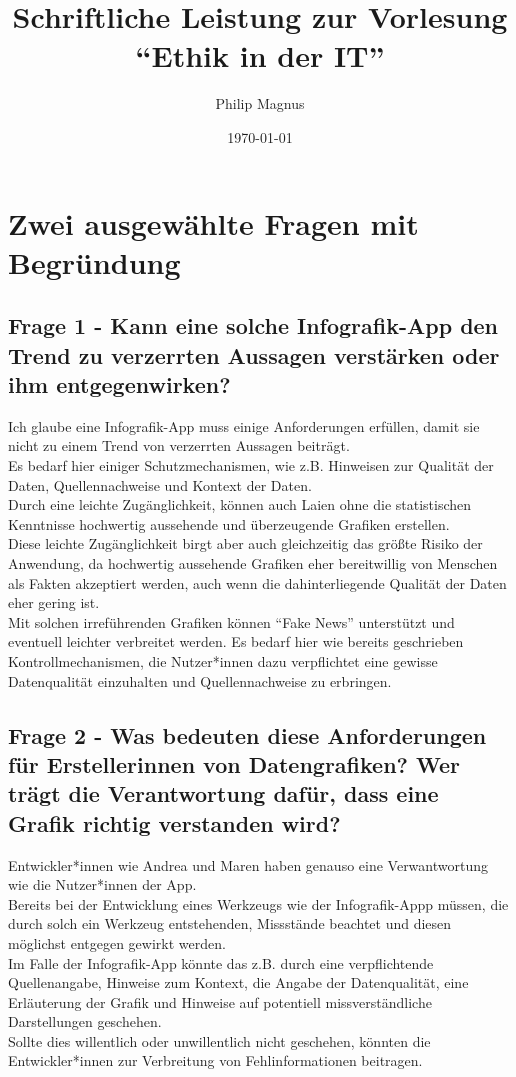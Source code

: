 \documentclass[12pt]{article}
\title{Schriftliche Leistung zur Vorlesung ``Ethik in der IT''}
\author{Philip Magnus}
\date{\today}
\begin{document}
\maketitle

\section{Zwei ausgewählte Fragen mit Begründung}

\subsection*{Frage 1 - Kann eine solche Infografik-App den Trend zu verzerrten Aussagen verstärken oder ihm entgegenwirken?}

Ich glaube eine Infografik-App muss einige Anforderungen erfüllen, damit sie nicht zu einem Trend von verzerrten Aussagen beiträgt.\\
Es bedarf hier einiger Schutzmechanismen, wie z.B. Hinweisen zur Qualität der Daten, Quellennachweise und Kontext der Daten.\\
Durch eine leichte Zugänglichkeit, können auch Laien ohne die statistischen Kenntnisse hochwertig aussehende und überzeugende Grafiken erstellen.\\
Diese leichte Zugänglichkeit birgt aber auch gleichzeitig das größte Risiko der Anwendung, da hochwertig aussehende Grafiken eher bereitwillig von Menschen als Fakten akzeptiert werden, auch wenn die dahinterliegende Qualität der Daten eher gering ist.\\
Mit solchen irreführenden Grafiken können ``Fake News'' unterstützt und eventuell leichter verbreitet werden. Es bedarf hier wie bereits geschrieben Kontrollmechanismen, die Nutzer*innen dazu verpflichtet eine gewisse Datenqualität einzuhalten und Quellennachweise zu erbringen.\\

\subsection*{Frage 2 - Was bedeuten diese Anforderungen für Erstellerinnen von Datengrafiken? Wer trägt die Verantwortung dafür, dass eine Grafik richtig verstanden wird?}

Entwickler*innen wie Andrea und Maren haben genauso eine Verwantwortung wie die Nutzer*innen der App.\\
Bereits bei der Entwicklung eines Werkzeugs wie der Infografik-Appp müssen, die durch solch ein Werkzeug entstehenden, Missstände beachtet und diesen möglichst entgegen gewirkt werden.\\
Im Falle der Infografik-App könnte das z.B. durch eine verpflichtende Quellenangabe, Hinweise zum Kontext, die Angabe der Datenqualität, eine Erläuterung der Grafik und Hinweise auf potentiell missverständliche Darstellungen geschehen.\\
Sollte dies willentlich oder unwillentlich nicht geschehen, könnten die Entwickler*innen zur Verbreitung von Fehlinformationen beitragen.
\end{document}
